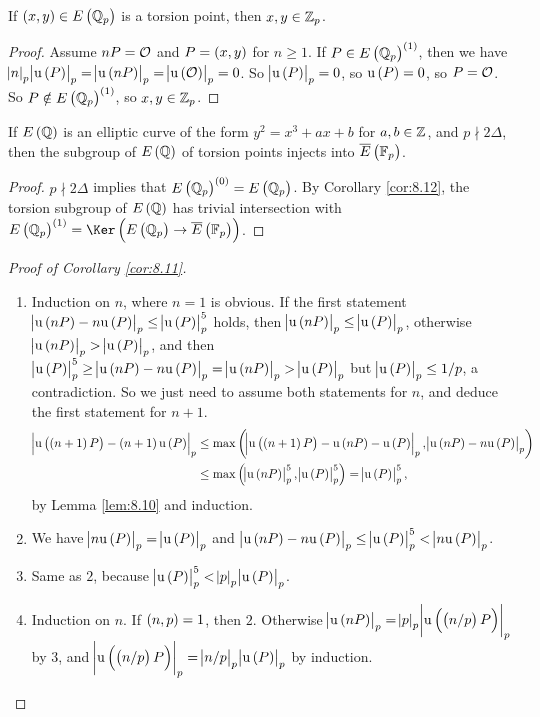 \begin{corollary}
\label{cor:8.12}
If $ \br{x, y} \in E\br{\QQ_p} $ is a torsion point, then $ x, y \in \mathbb{Z}_p $.
\end{corollary}

\begin{proof}
Assume $ nP = \mathcal{O} $ and $ P = \br{x, y} $ for $ n \ge 1 $. If $ P \in E\br{\QQ_p}^{\br{1}} $, then we have $ \abs{n}_p\abs{\u\br{P}}_p = \abs{\u\br{nP}}_p = \abs{\u\br{\OOO}}_p = 0 $. So $ \abs{\u\br{P}}_p = 0 $, so $ \u\br{P} = 0 $, so $ P = \mathcal{O} $. So $ P \notin E\br{\QQ_p}^{\br{1}} $, so $ x, y \in \mathbb{Z}_p $.
\end{proof}

\begin{corollary}
If $ E\br{\QQ} $ is an elliptic curve of the form $ y^2 = x^3 + ax + b $ for $ a, b \in \mathbb{Z} $, and $ p \nmid 2\Delta $, then the subgroup of $ E\br{\QQ} $ of torsion points injects into $ \overline{E}\br{\FF_p} $.
\end{corollary}

\begin{proof}
$ p \nmid 2\Delta $ implies that $ E\br{\QQ_p}^{\br{0}} = E\br{\QQ_p} $. By Corollary \ref{cor:8.12}, the torsion subgroup of $ E\br{\QQ} $ has trivial intersection with $ E\br{\QQ_p}^{\br{1}} = \Ker \br{E\br{\QQ_p} \to \overline{E}\br{\FF_p}} $.
\end{proof}

\begin{proof}[Proof of Corollary \ref{cor:8.11}]
\hfill
\begin{enumerate}
\item Induction on $ n $, where $ n = 1 $ is obvious. If the first statement $ \abs{\u\br{nP} - n\u\br{P}}_p \le \abs{\u\br{P}}_p^5 $ holds, then $ \abs{\u\br{nP}}_p \le \abs{\u\br{P}}_p $, otherwise $ \abs{\u\br{nP}}_p > \abs{\u\br{P}}_p $, and then $ \abs{\u\br{P}}_p^5 \ge \abs{\u\br{nP} - n\u\br{P}}_p = \abs{\u\br{nP}}_p > \abs{\u\br{P}}_p $ but $ \abs{\u\br{P}}_p \le 1 / p $, a contradiction. So we just need to assume both statements for $ n $, and deduce the first statement for $ n + 1 $.
\begin{align*}
\abs{\u\br{\br{n + 1}P} - \br{n + 1}\u\br{P}}_p
& \le \max\br{\abs{\u\br{\br{n + 1}P} - \u\br{nP} - \u\br{P}}_p, \abs{\u\br{nP} - n\u\br{P}}_p} \\
& \le \max\br{\abs{\u\br{nP}}_p^5, \abs{\u\br{P}}_p^5}
= \abs{\u\br{P}}_p^5,
\end{align*}
by Lemma \ref{lem:8.10} and induction.
\item We have $ \abs{n\u\br{P}}_p = \abs{\u\br{P}}_p $ and $ \abs{\u\br{nP} - n\u\br{P}}_p \le \abs{\u\br{P}}_p^5 < \abs{n\u\br{P}}_p $.
\item Same as $ 2 $, because $ \abs{\u\br{P}}_p^5 < \abs{p}_p\abs{\u\br{P}}_p $.
\item Induction on $ n $. If $ \br{n, p} = 1 $, then $ 2 $. Otherwise $ \abs{\u\br{nP}}_p = \abs{p}_p\abs{\u\br{\br{n / p}P}}_p $ by $ 3 $, and $ \abs{\u\br{\br{n / p}P}}_p = \abs{n / p}_p\abs{\u\br{P}}_p $ by induction.
\end{enumerate}
\end{proof}

